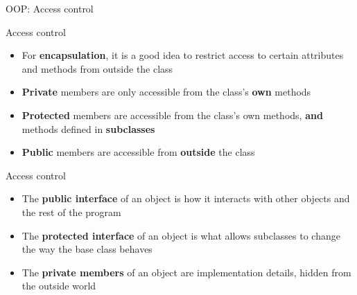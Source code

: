 \begin{frame}{OOP: Access control}
\end{frame}

\begin{frame}{Access control}
\begin{itemize}
	\pause\item For \textbf{encapsulation}, it is a good idea to restrict access to certain attributes and methods from outside the class
	\pause\item \textbf{Private} members are only accessible from the class's \textbf{own} methods
	\pause\item \textbf{Protected} members are accessible from the class's own methods, \textbf{and} methods defined in \textbf{subclasses}
	\pause\item \textbf{Public} members are accessible from \textbf{outside} the class
\end{itemize}
\end{frame}

\begin{frame}{Access control}
\begin{itemize}
	\pause\item The \textbf{public interface} of an object is how it interacts with other objects and the rest of the program
	\pause\item The \textbf{protected interface} of an object is what allows subclasses to change the way the base class behaves
	\pause\item The \textbf{private members} of an object are implementation details, hidden from the outside world
\end{itemize}
\end{frame}


